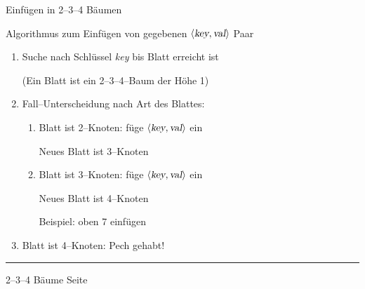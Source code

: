 \begin{slide}{}
\normalsize

\begin{center}
Einf\"ugen in 2--3--4 B\"aumen
\end{center}
\vspace*{0.5cm}

\footnotesize
Algorithmus zum Einf\"ugen von gegebenen $\langle \textsl{key}, \textsl{val} \rangle$ Paar
\begin{enumerate}
\item Suche nach Schl\"ussel \textsl{key} bis Blatt erreicht ist

      (Ein Blatt ist ein 2--3--4--Baum der H\"ohe 1)
\item Fall--Unterscheidung nach Art des Blattes:
      \begin{enumerate}
      \item Blatt ist 2--Knoten: f\"uge $\langle \textsl{key}, \textsl{val} \rangle$ ein

            Neues Blatt ist 3--Knoten

 \raisebox{2cm}{ \ 1 einf\"ugen \ }           
      \item Blatt ist 3--Knoten: f\"uge $\langle \textsl{key}, \textsl{val} \rangle$ ein

            Neues Blatt ist 4--Knoten 
            \vspace*{0.5cm}

            Beispiel: oben 7 einf\"ugen

            \hspace*{2cm} 
      \end{enumerate}
      \item Blatt ist 4--Knoten: Pech gehabt!
\end{enumerate}

\vspace*{\fill}
\tiny \addtocounter{mypage}{1}
\rule{17cm}{1mm}
2--3--4 B\"aume  \hspace*{\fill} Seite 
\end{slide}


